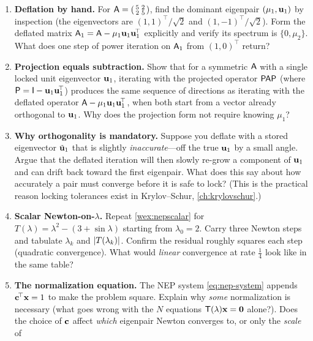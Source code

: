 \exercisessection
\begin{enumerate}[nosep]
  \item \textbf{Deflation by hand.} For
  $\mathsf{A}=\begin{psmallmatrix}5&2\\2&5\end{psmallmatrix}$, find the dominant
  eigenpair $(\mu_1,\mathbf{u}_1)$ by inspection (the eigenvectors are
  $(1,1)^{\!\top}/\sqrt2$ and $(1,-1)^{\!\top}/\sqrt2$). Form the deflated matrix
  $\mathsf{A}_1=\mathsf{A}-\mu_1\mathbf{u}_1\mathbf{u}_1^{\!\top}$ explicitly and verify its spectrum is
  $\{0,\mu_2\}$. What does one step of power iteration on $\mathsf{A}_1$ from
  $(1,0)^{\!\top}$ return?
  \item \textbf{Projection equals subtraction.} Show that for a symmetric
  $\mathsf{A}$ with a single locked unit eigenvector $\mathbf{u}_1$, iterating with the
  projected operator $\mathsf{P}\mathsf{A}\mathsf{P}$ (where
  $\mathsf{P}=\mathsf{I}-\mathbf{u}_1\mathbf{u}_1^{\!\top}$) produces the same sequence of directions as
  iterating with the deflated operator $\mathsf{A}-\mu_1\mathbf{u}_1\mathbf{u}_1^{\!\top}$, when both
  start from a vector already orthogonal to $\mathbf{u}_1$. Why does the projection form
  not require knowing $\mu_1$?
  \item \textbf{Why orthogonality is mandatory.} Suppose you deflate with a stored
  eigenvector $\tilde{\mathbf{u}}_1$ that is slightly \emph{inaccurate}---off the true
  $\mathbf{u}_1$ by a small angle. Argue that the deflated iteration will then slowly
  re-grow a component of $\mathbf{u}_1$ and can drift back toward the first eigenpair.
  What does this say about how accurately a pair must converge before it is safe to
  lock? (This is the practical reason locking tolerances exist in Krylov--Schur,
  \cref{ch:krylovschur}.)
  \item \textbf{Scalar Newton-on-$\lambda$.} Repeat \cref{wex:nepscalar} for
  $T(\lambda)=\lambda^2-(3+\sin\lambda)$ starting from $\lambda_0=2$. Carry three
  Newton steps and tabulate $\lambda_k$ and $\lvert T(\lambda_k)\rvert$. Confirm the
  residual roughly squares each step (quadratic convergence). What would
  \emph{linear} convergence at rate $\tfrac14$ look like in the same table?
  \item \textbf{The normalization equation.} The NEP system
  \cref{eq:nep-system} appends $\mathbf{c}^{\!\top}\mathbf{x}=1$ to make the problem square.
  Explain why \emph{some} normalization is necessary (what goes wrong with the
  $N$ equations $\mathsf{T}(\lambda)\mathbf{x}=\mathbf 0$ alone?). Does the choice of $\mathbf{c}$
  affect \emph{which} eigenpair Newton converges to, or only the \emph{scale} of

\end{enumerate}

